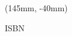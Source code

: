 \renewcommand{\ttdefault}{hlst}

\begin{textblock*}{71mm}(145mm, -40mm)
  \large\ttfamily\raggedright
  \textblockcolor{}
  ISBN \\ \ISBN
\end{textblock*}

